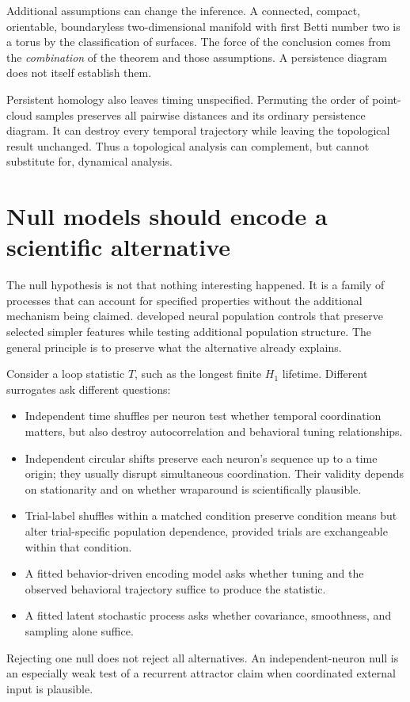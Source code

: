 Additional assumptions can change the inference. A connected, compact, orientable, boundaryless two-dimensional manifold with first Betti number two is a torus by the classification of surfaces. The force of the conclusion comes from the \emph{combination} of the theorem and those assumptions. A persistence diagram does not itself establish them.

Persistent homology also leaves timing unspecified. Permuting the order of point-cloud samples preserves all pairwise distances and its ordinary persistence diagram. It can destroy every temporal trajectory while leaving the topological result unchanged. Thus a topological analysis can complement, but cannot substitute for, dynamical analysis.

\section{Null models should encode a scientific alternative}\label{sec:12-nulls}
The null hypothesis is not that nothing interesting happened. It is a family of processes that can account for specified properties without the additional mechanism being claimed. \citet{ev_elsayed2017} developed neural population controls that preserve selected simpler features while testing additional population structure. The general principle is to preserve what the alternative already explains.

Consider a loop statistic \(T\), such as the longest finite \(H_1\) lifetime. Different surrogates ask different questions:
\begin{itemize}
\item Independent time shuffles per neuron test whether temporal coordination matters, but also destroy autocorrelation and behavioral tuning relationships.
\item Independent circular shifts preserve each neuron's sequence up to a time origin; they usually disrupt simultaneous coordination. Their validity depends on stationarity and on whether wraparound is scientifically plausible.
\item Trial-label shuffles within a matched condition preserve condition means but alter trial-specific population dependence, provided trials are exchangeable within that condition.
\item A fitted behavior-driven encoding model asks whether tuning and the observed behavioral trajectory suffice to produce the statistic.
\item A fitted latent stochastic process asks whether covariance, smoothness, and sampling alone suffice.
\end{itemize}
Rejecting one null does not reject all alternatives. An independent-neuron null is an especially weak test of a recurrent attractor claim when coordinated external input is plausible.

